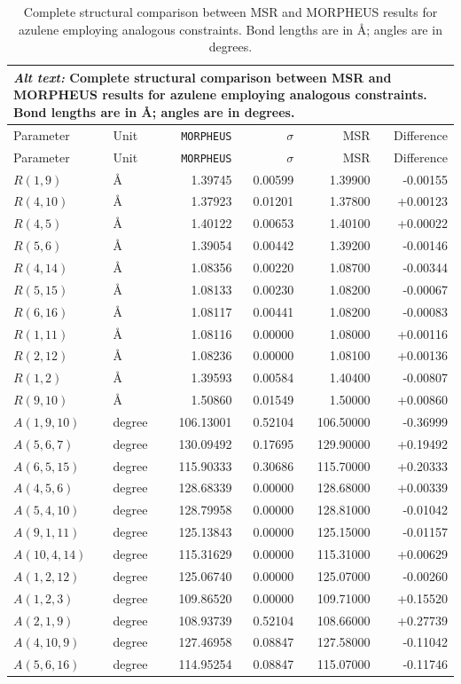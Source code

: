 \documentclass[12pt]{article}
\begin{document}
\begin{longtable}{llrrrr}
\caption{Complete structural comparison between MSR and MORPHEUS results for azulene employing
analogous constraints. Bond lengths are in \AA; angles are in degrees.}\label{tab:si-azulene-msr-parameters}\\
\multicolumn{6}{p{0.98\linewidth}}{\textit{Alt text:} Complete structural comparison between MSR and MORPHEUS results for azulene employing analogous constraints. Bond lengths are in \AA; angles are in degrees.}\\
\toprule
Parameter & Unit & \texttt{MORPHEUS} & $\sigma$ & MSR & Difference \\
\midrule
\endfirsthead
\toprule
Parameter & Unit & \texttt{MORPHEUS} & $\sigma$ & MSR & Difference \\
\midrule
\endhead
$R(1,9)$ & \AA & 1.39745 & 0.00599 & 1.39900 & -0.00155 \\
$R(4,10)$ & \AA & 1.37923 & 0.01201 & 1.37800 & +0.00123 \\
$R(4,5)$ & \AA & 1.40122 & 0.00653 & 1.40100 & +0.00022 \\
$R(5,6)$ & \AA & 1.39054 & 0.00442 & 1.39200 & -0.00146 \\
$R(4,14)$ & \AA & 1.08356 & 0.00220 & 1.08700 & -0.00344 \\
$R(5,15)$ & \AA & 1.08133 & 0.00230 & 1.08200 & -0.00067 \\
$R(6,16)$ & \AA & 1.08117 & 0.00441 & 1.08200 & -0.00083 \\
$R(1,11)$ & \AA & 1.08116 & 0.00000 & 1.08000 & +0.00116 \\
$R(2,12)$ & \AA & 1.08236 & 0.00000 & 1.08100 & +0.00136 \\
$R(1,2)$ & \AA & 1.39593 & 0.00584 & 1.40400 & -0.00807 \\
$R(9,10)$ & \AA & 1.50860 & 0.01549 & 1.50000 & +0.00860 \\
$A(1,9,10)$ & degree & 106.13001 & 0.52104 & 106.50000 & -0.36999 \\
$A(5,6,7)$ & degree & 130.09492 & 0.17695 & 129.90000 & +0.19492 \\
$A(6,5,15)$ & degree & 115.90333 & 0.30686 & 115.70000 & +0.20333 \\
$A(4,5,6)$ & degree & 128.68339 & 0.00000 & 128.68000 & +0.00339 \\
$A(5,4,10)$ & degree & 128.79958 & 0.00000 & 128.81000 & -0.01042 \\
$A(9,1,11)$ & degree & 125.13843 & 0.00000 & 125.15000 & -0.01157 \\
$A(10,4,14)$ & degree & 115.31629 & 0.00000 & 115.31000 & +0.00629 \\
$A(1,2,12)$ & degree & 125.06740 & 0.00000 & 125.07000 & -0.00260 \\
$A(1,2,3)$ & degree & 109.86520 & 0.00000 & 109.71000 & +0.15520 \\
$A(2,1,9)$ & degree & 108.93739 & 0.52104 & 108.66000 & +0.27739 \\
$A(4,10,9)$ & degree & 127.46958 & 0.08847 & 127.58000 & -0.11042 \\
$A(5,6,16)$ & degree & 114.95254 & 0.08847 & 115.07000 & -0.11746 \\
\bottomrule
\end{longtable}
\end{document}
